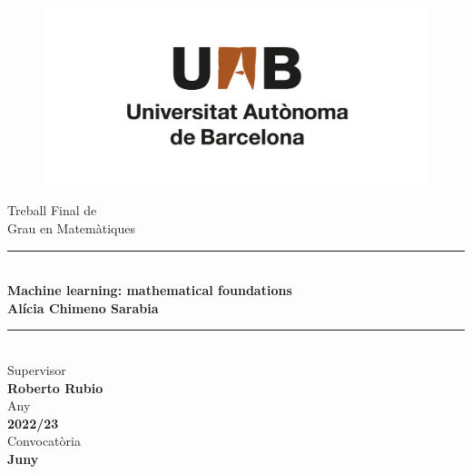 \documentclass[/main.tex]{subfiles}
\begin{document}
	\begin{center}
	    \begin{figure}
	        \centering
	        \includegraphics[width=0.6\linewidth]{imgs/uab.png}
	    \end{figure} \mbox{} \par
		\vspace{1cm}
		{\Huge Treball Final de} \\ \bigskip
		{\LARGE Grau en Matemàtiques} \\
		\vfill
        \noindent\rule{\textwidth}{1pt} \\ \bigskip
		{\Huge \bfseries Machine learning: mathematical foundations} \\
		\vspace{1cm}
		{\LARGE \textbf{Alícia Chimeno Sarabia}} \\ \bigskip %
	    \noindent\rule{\textwidth}{1pt} \\ 
	    \vfill
	    Supervisor \\ \textbf{Roberto Rubio} \\ \medskip
		Any \\ \textbf{2022/23} \\ \medskip
		Convocatòria \\ \textbf{Juny}
	\end{center}
\end{document}
